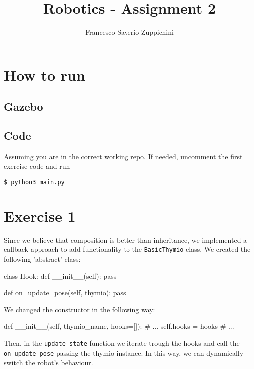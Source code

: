 \documentclass[11pt]{article}
\title{Robotics - Assignment 2}
\author{Francesco Saverio Zuppichini}
\begin{document}
\maketitle
\section{How to run}
\subsection{Gazebo}

\subsection{Code}
Assuming you are in the correct working repo. If needed, uncomment the first exercise code and run
\begin{lstlisting}
$ python3 main.py	
\end{lstlisting}
\section{Exercise 1}
Since we believe that composition is better than inheritance, we implemented a callback approach to add functionality to the \texttt{BasicThymio} class. We created the following 'abstract' class:

\begin{python}
class Hook:
    def __init__(self):
        pass

    def on_update_pose(self, thymio):
        pass
	
\end{python}

We changed the constructor in the following way:
\begin{python}

def __init__(self, thymio_name, hooks=[]):
	# ...
	self.hooks = hooks
	# ...
\end{python}

Then, in the \texttt{update\_state} function we iterate trough the hooks and call the \texttt{on\_update\_pose} passing the thymio instance. In this way, we can dynamically switch the robot's behaviour.
\end{document}
